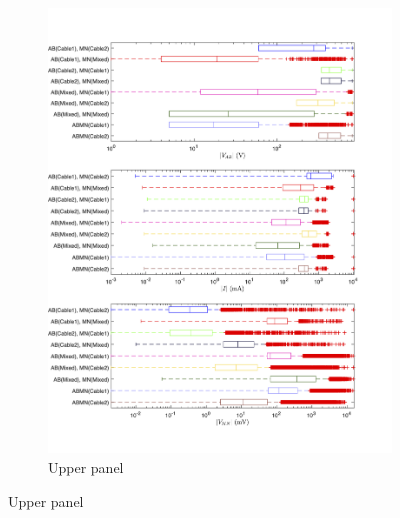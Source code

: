 \documentclass[final,authoryear,5p,times,twocolumn]{elsarticle}
\begin{document}
\begin{figure}[!ht]
   \centering

   \begin{subfigure}[b]{0.86\linewidth}
       \centering
       \includegraphics[trim=0cm 1.5cm 2cm 2cm, clip=true, width=\linewidth]{./Figures/Fig9a.png}
       \caption{Upper panel}
       \label{fig:CableSplit_Cluster_PropBoxPlot1}
   \end{subfigure}

   \vspace{1em}


\end{figure}
\end{document}
